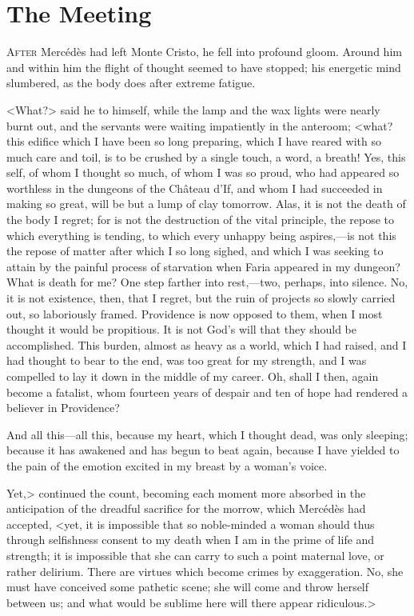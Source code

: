 \chapter{The Meeting} 

 \lettrine{A}{fter} Mercédès had left Monte Cristo, he fell into profound gloom. Around him and within him the flight of thought seemed to have stopped; his energetic mind slumbered, as the body does after extreme fatigue. 

 <What?> said he to himself, while the lamp and the wax lights were nearly burnt out, and the servants were waiting impatiently in the anteroom; <what? this edifice which I have been so long preparing, which I have reared with so much care and toil, is to be crushed by a single touch, a word, a breath! Yes, this self, of whom I thought so much, of whom I was so proud, who had appeared so worthless in the dungeons of the Château d'If, and whom I had succeeded in making so great, will be but a lump of clay tomorrow. Alas, it is not the death of the body I regret; for is not the destruction of the vital principle, the repose to which everything is tending, to which every unhappy being aspires,—is not this the repose of matter after which I so long sighed, and which I was seeking to attain by the painful process of starvation when Faria appeared in my dungeon? What is death for me? One step farther into rest,—two, perhaps, into silence. No, it is not existence, then, that I regret, but the ruin of projects so slowly carried out, so laboriously framed. Providence is now opposed to them, when I most thought it would be propitious. It is not God's will that they should be accomplished. This burden, almost as heavy as a world, which I had raised, and I had thought to bear to the end, was too great for my strength, and I was compelled to lay it down in the middle of my career. Oh, shall I then, again become a fatalist, whom fourteen years of despair and ten of hope had rendered a believer in Providence? 

 And all this—all this, because my heart, which I thought dead, was only sleeping; because it has awakened and has begun to beat again, because I have yielded to the pain of the emotion excited in my breast by a woman's voice. 

Yet,> continued the count, becoming each moment more absorbed in the anticipation of the dreadful sacrifice for the morrow, which Mercédès had accepted, <yet, it is impossible that so noble-minded a woman should thus through selfishness consent to my death when I am in the prime of life and strength; it is impossible that she can carry to such a point maternal love, or rather delirium. There are virtues which become crimes by exaggeration. No, she must have conceived some pathetic scene; she will come and throw herself between us; and what would be sublime here will there appear ridiculous.> 


